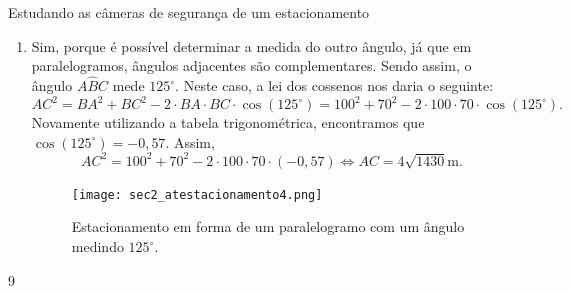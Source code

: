 \begin{answer}{Estudando as câmeras de segurança de um estacionamento}
{\begin{enumerate}
    \item{}
    Sim, porque é possível determinar a medida do outro ângulo, já que em paralelogramos, ângulos adjacentes são complementares. Sendo assim, o ângulo $A\hat{B}C$ mede $125^\circ$. Neste caso, a lei dos cossenos nos daria o seguinte:
    $$AC^2=BA^2+BC^2-2\cdot BA\cdot BC\cdot \cos(125^\circ)=100^2+70^2-2\cdot100\cdot70\cdot \cos(125^\circ).$$
    Novamente utilizando a tabela trigonométrica, encontramos que $\cos(125^\circ)=-0,57$. Assim,
    $$AC^2=100^2+70^2-2\cdot100\cdot70\cdot (-0,57) \iff AC=4\sqrt{1430}\text{m}.$$
    \begin{figure}[H]
        \centering
        \texttt{[image: sec2\_atestacionamento4.png]}
        \caption{Estacionamento em forma de um paralelogramo com um ângulo medindo $125^\circ$.}
        \label{sec2_resatestacionamento4}
    \end{figure}
\end{enumerate}
}{9}
\end{answer}

